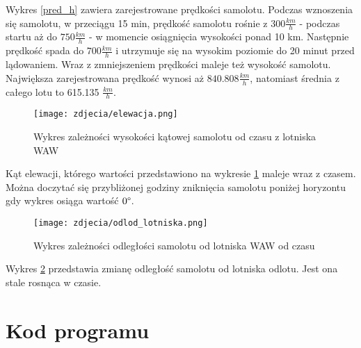 \documentclass[fleqn,10pt,a4paper]{article}
\begin{document}
Wykres \ref{pred_h} zawiera zarejestrowane prędkości samolotu. Podczas wznoszenia się samolotu, w przeciągu 15 min, prędkość samolotu rośnie z $300 \frac{km}{h}$ - 
podczas startu aż do $750 \frac{km}{h}$ -  w momencie osiągnięcia wysokości ponad 10 km. Następnie prędkość spada do $700 \frac{km}{h}$ i utrzymuje się na wysokim 
poziomie do 20 minut przed lądowaniem. Wraz z zmniejszeniem prędkości maleje też wysokość samolotu.
Największa zarejestrowana prędkość wynosi aż $840.808 \frac{km}{h}$, natomiast średnia z całego lotu to 615.135 $\frac{km}{h}$.

\begin{figure}[ht!]
  \centering
  \texttt{[image: zdjecia/elewacja.png]}
  \caption{Wykres zależności wysokości kątowej samolotu od czasu z lotniska WAW}
  \label{elewacja_h}
\end{figure}

Kąt elewacji, którego wartości przedstawiono na wykresie \ref{elewacja_h} maleje wraz z czasem. Można doczytać się przybliżonej
godziny zniknięcia samolotu poniżej horyzontu gdy wykres osiąga wartość $0 \degree$.

\begin{figure}[ht!]
  \centering
  \texttt{[image: zdjecia/odlod\_lotniska.png]}
  \caption{Wykres zależności odległości samolotu od lotniska WAW od czasu}
  \label{odleglosc_h}
\end{figure}

Wykres \ref{odleglosc_h} przedstawia zmianę odległość samolotu od lotniska odlotu. Jest ona stale rosnąca w czasie.

\clearpage
\section{Kod programu}
\end{document}
